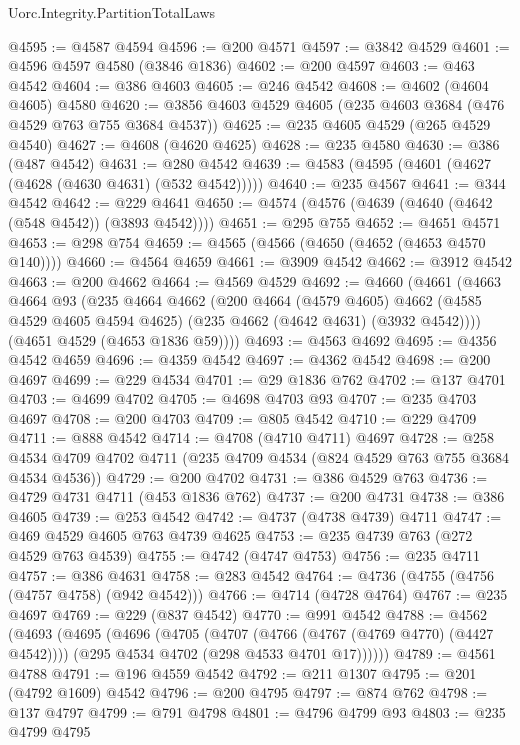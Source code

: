 \begin{lexlean}{Uorc.Integrity.PartitionTotalLaws}
\begin{coremodule}
@4595 := @4587 @4594
@4596 := @200 @4571
@4597 := @3842 @4529
@4601 := @4596 @4597 @4580 (@3846 @1836)
@4602 := @200 @4597
@4603 := @463 @4542
@4604 := @386 @4603
@4605 := @246 @4542
@4608 := @4602 (@4604 @4605) @4580
@4620 := @3856 @4603 @4529 @4605 (@235 @4603 @3684 (@476 @4529 @763 @755 @3684 @4537))
@4625 := @235 @4605 @4529 (@265 @4529 @4540)
@4627 := @4608 (@4620 @4625)
@4628 := @235 @4580
@4630 := @386 (@487 @4542)
@4631 := @280 @4542
@4639 := @4583 (@4595 (@4601 (@4627 (@4628 (@4630 @4631) (@532 @4542)))))
@4640 := @235 @4567
@4641 := @344 @4542
@4642 := @229 @4641
@4650 := @4574 (@4576 (@4639 (@4640 (@4642 (@548 @4542)) (@3893 @4542))))
@4651 := @295 @755
@4652 := @4651 @4571
@4653 := @298 @754
@4659 := @4565 (@4566 (@4650 (@4652 (@4653 @4570 @140))))
@4660 := @4564 @4659
@4661 := @3909 @4542
@4662 := @3912 @4542
@4663 := @200 @4662
@4664 := @4569 @4529
@4692 := @4660
    (@4661
      (@4663
        @4664
        @93
        (@235
          @4664
          @4662
          (@200
            @4664
            (@4579 @4605)
            @4662
            (@4585 @4529 @4605 @4594 @4625)
            (@235 @4662 (@4642 @4631) (@3932 @4542))))
        (@4651 @4529 (@4653 @1836 @59))))
@4693 := @4563 @4692
@4695 := @4356 @4542 @4659
@4696 := @4359 @4542
@4697 := @4362 @4542
@4698 := @200 @4697
@4699 := @229 @4534
@4701 := @29 @1836 @762
@4702 := @137 @4701
@4703 := @4699 @4702
@4705 := @4698 @4703 @93
@4707 := @235 @4703 @4697
@4708 := @200 @4703
@4709 := @805 @4542
@4710 := @229 @4709
@4711 := @888 @4542
@4714 := @4708 (@4710 @4711) @4697
@4728 := @258 @4534 @4709 @4702 @4711 (@235 @4709 @4534 (@824 @4529 @763 @755 @3684 @4534 @4536))
@4729 := @200 @4702
@4731 := @386 @4529 @763
@4736 := @4729 @4731 @4711 (@453 @1836 @762)
@4737 := @200 @4731
@4738 := @386 @4605
@4739 := @253 @4542
@4742 := @4737 (@4738 @4739) @4711
@4747 := @469 @4529 @4605 @763 @4739 @4625
@4753 := @235 @4739 @763 (@272 @4529 @763 @4539)
@4755 := @4742 (@4747 @4753)
@4756 := @235 @4711
@4757 := @386 @4631
@4758 := @283 @4542
@4764 := @4736 (@4755 (@4756 (@4757 @4758) (@942 @4542)))
@4766 := @4714 (@4728 @4764)
@4767 := @235 @4697
@4769 := @229 (@837 @4542)
@4770 := @991 @4542
@4788 := @4562
    (@4693
      (@4695
        (@4696
          (@4705
            (@4707 (@4766 (@4767 (@4769 @4770) (@4427 @4542))))
            (@295 @4534 @4702 (@298 @4533 @4701 @17))))))
@4789 := @4561 @4788
@4791 := @196 @4559 @4542
@4792 := @211 @1307
@4795 := @201 (@4792 @1609) @4542
@4796 := @200 @4795
@4797 := @874 @762
@4798 := @137 @4797
@4799 := @791 @4798
@4801 := @4796 @4799 @93
@4803 := @235 @4799 @4795

\end{coremodule}
\end{lexlean}
